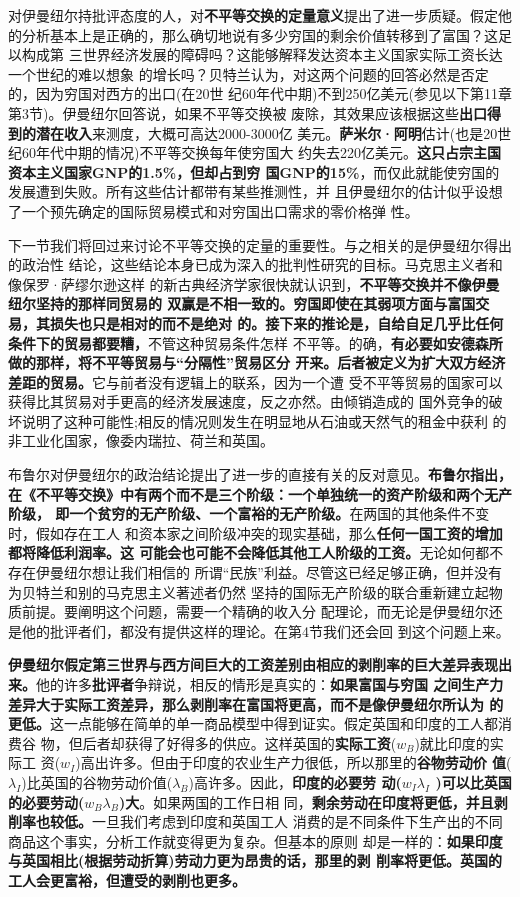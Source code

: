 对伊曼纽尔持批评态度的人，对\textbf{不平等交换的定量意义}提出了进一步质疑。假定他
的分析基本上是正确的，那么确切地说有多少穷国的剩余价值转移到了富国？这足以构成第
三世界经济发展的障碍吗？这能够解释发达资本主义国家实际工资长达一个世纪的难以想象
的增长吗？贝特兰认为，对这两个问题的回答必然是否定的，因为穷国对西方的出口(在20世
纪60年代中期)不到250亿美元(参见以下第11章第3节)。伊曼纽尔回答说，如果不平等交换被
废除，其效果应该根据这些\textbf{出口得到的潜在收入}来测度，大概可高达2000-3000亿
美元。\textbf{萨米尔·阿明}估计(也是20世纪60年代中期的情况)不平等交换每年使穷国大
约失去220亿美元。\textbf{这只占宗主国资本主义国家GNP的1.5\%，但却占到穷
  国GNP的15\%}，而仅此就能使穷国的发展遭到失败。所有这些估计都带有某些推测性，并
且伊曼纽尔的估计似乎设想了一个预先确定的国际贸易模式和对穷国出口需求的零价格弹
性。

下一节我们将回过来讨论不平等交换的定量的重要性。与之相关的是伊曼纽尔得出的政治性
结论，这些结论本身已成为深入的批判性研究的目标。马克思主义者和像保罗·萨缪尔逊这样
的新古典经济学家很快就认识到，\textbf{不平等交换并不像伊曼纽尔坚持的那样同贸易的
  双赢是不相一致的。穷国即使在其弱项方面与富国交易，其损失也只是相对的而不是绝对
  的。接下来的推论是，自给自足几乎比任何条件下的贸易都要糟，}不管这种贸易条件怎样
不平等。的确，\textbf{有必要如安德森所做的那样，将不平等贸易与“分隔性”贸易区分
  开来。后者被定义为扩大双方经济差距的贸易。}它与前者没有逻辑上的联系，因为一个遭
受不平等贸易的国家可以获得比其贸易对手更高的经济发展速度，反之亦然。由倾销造成的
国外竞争的破坏说明了这种可能性;相反的情况则发生在明显地从石油或天然气的租金中获利
的非工业化国家，像委内瑞拉、荷兰和英国。

布鲁尔对伊曼纽尔的政治结论提出了进一步的直接有关的反对意见。\textbf{布鲁尔指出，
  在《不平等交换》中有两个而不是三个阶级：一个单独统一的资产阶级和两个无产阶级，
  即一个贫穷的无产阶级、一个富裕的无产阶级。}在两国的其他条件不变时，假如存在工人
和资本家之间阶级冲突的现实基础，那么\textbf{任何一国工资的增加都将降低利润率。这
  可能会也可能不会降低其他工人阶级的工资。}无论如何都不存在伊曼纽尔想让我们相信的
所谓“民族”利益。尽管这已经足够正确，但并没有为贝特兰和别的马克思主义著述者仍然
坚持的国际无产阶级的联合重新建立起物质前提。要阐明这个问题，需要一个精确的收入分
配理论，而无论是伊曼纽尔还是他的批评者们，都没有提供这样的理论。在第4节我们还会回
到这个问题上来。

\textbf{伊曼纽尔假定第三世界与西方间巨大的工资差别由相应的剥削率的巨大差异表现出
  来。}他的许多\textbf{批评者}争辩说，相反的情形是真实的：\textbf{如果富国与穷国
  之间生产力差异大于实际工资差异，那么剥削率在富国将更高，而不是像伊曼纽尔所认为
  的更低。}这一点能够在简单的单一商品模型中得到证实。假定英国和印度的工人都消费谷
物，但后者却获得了好得多的供应。这样英国的\textbf{实际工资}($w_B$)就比印度的实际工
资($w_I$)高出许多。但由于印度的农业生产力很低，所以那里的\textbf{谷物劳动价
  值}($\lambda _I$)比英国的谷物劳动价值($\lambda _B$)高许多。因此，\textbf{印度的必要劳
  动($w_I \lambda _I$ )可以比英国的必要劳动($w_B \lambda _B$)大}。如果两国的工作日相
同，\textbf{剩余劳动在印度将更低，并且剥削率也较低。}一旦我们考虑到印度和英国工人
消费的是不同条件下生产出的不同商品这个事实，分析工作就变得更为复杂。但基本的原则
却是一样的：\textbf{如果印度与英国相比(根据劳动折算)劳动力更为昂贵的话，那里的剥
  削率将更低。英国的工人会更富裕，但遭受的剥削也更多。}


